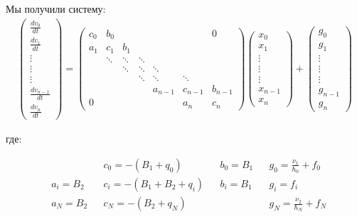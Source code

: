 Мы получили систему:
\begin{align*}
  \begin{pmatrix}
    \frac{d v_0}{dt} \\
    \frac{d v_1}{dt} \\
    \vdots \\
    \vdots \\
    \vdots \\
    \frac{d v_{n-1}}{dt} \\
    \frac{d v_{n}}{dt} 
  \end{pmatrix} 
  =
  \begin{pmatrix}
    c_0 & b_0 & &  &  &  & 0 \\
    a_1 & c_1 & b_1 &  & & & \\
     &   \ddots & \ddots & \ddots & & & \\
     & &  \ddots & \ddots & \ddots & &  \\
     & & & \ddots & \ddots & \ddots &  \\
     &  &  & & a_{n-1} & c_{n-1} & b_{n-1} \\
     0 & & & &  &a_n & c_n
  \end{pmatrix}
  \begin{pmatrix}
    x_0 \\
    x_1 \\
    \vdots \\
    \vdots \\
    \vdots \\
    x_{n-1} \\
    x_n
  \end{pmatrix} +
  \begin{pmatrix}
    g_0 \\
    g_1 \\
    \vdots \\
    \vdots \\
    \vdots \\
    g_{n-1} \\
    g_n
  \end{pmatrix}
\end{align*}

где:

\begin{align*}
  & & &c_0=-(B_1 + q_0) & &b_0=B_1 & &g_0= \frac{\nu_1}{\hbar_0} + f_0 \\
  &a_i=B_2 & &c_i=-(B_1 + B_2 + q_i) & &b_i=B_1 & &g_i=f_i \\
  &a_N=B_2 & &c_N=-(B_2 + q_N) & & & &g_N= \frac{\nu_2}{\hbar_N} + f_N
\end{align*}

